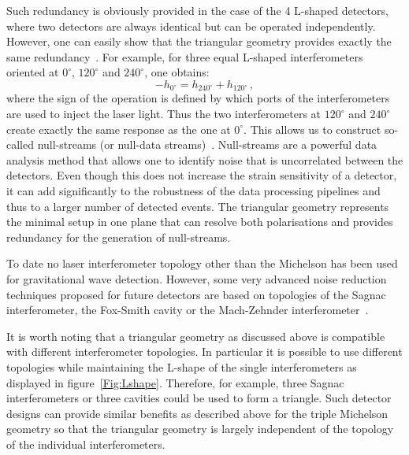 Such redundancy is obviously provided in the case of the 4 L-shaped  detectors, where two detectors are
always identical but can be operated independently. However, one can easily show that the triangular geometry
provides exactly the same redundancy~\cite{Freise2009}. For example, for three equal L-shaped interferometers
oriented at $0^\circ$, $120^\circ$ and $240^\circ$, one obtains:
\begin{equation}
-h_{0^\circ}= h_{240^\circ}+h_{120^\circ}\,,
\end{equation}
where the sign of the operation is defined by which ports of the interferometers
are used to inject the laser light. Thus the two interferometers at $120^\circ$ and $240^\circ$
create exactly the same response as the one at $0^\circ$. This allows
us to construct
so-called null-streams (or null-data streams)~\cite{GurselTinto1989}. Null-streams are a powerful
data analysis method that allows one to identify noise that is uncorrelated between the
detectors. Even though this does not increase the strain sensitivity of a detector,
it can add significantly to the robustness of the data processing
pipelines and thus to a larger number of detected events.
The triangular geometry represents the minimal setup in one plane that can resolve both polarisations
and provides redundancy for the generation of null-streams.

\FloatBarrier
To date no laser interferometer topology other than the Michelson has been
used for gravitational wave detection. However, some very advanced
noise reduction techniques proposed for future
detectors are based on topologies of the Sagnac interferometer, the Fox-Smith cavity or the
Mach-Zehnder interferometer~\cite{Chen2003,danilishin2006,Chen06b}.

It is worth noting that a triangular geometry as discussed above
is compatible with different interferometer
topologies. In particular it is possible to use different
topologies while maintaining the {\sf L}-shape of the single
interferometers
as displayed in figure~\ref{Fig:Lshape}.
Therefore, for example, three Sagnac interferometers or three cavities
could be used to form a triangle.
Such detector designs can provide similar benefits as described above for the
triple Michelson geometry so that the triangular geometry is largely independent
of the topology of the individual interferometers.

